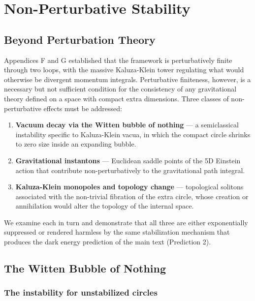 \documentclass[aps,prd,preprint,superscriptaddress,longbibliography,floatfix]{revtex4-2}
\theoremstyle{remark}
\begin{document}
\section{Non-Perturbative Stability}


\subsection{Beyond Perturbation Theory}

Appendices F and G established that the framework is perturbatively finite through two loops, with the massive Kaluza-Klein tower regulating what would otherwise be divergent momentum integrals. Perturbative finiteness, however, is a necessary but not sufficient condition for the consistency of any gravitational theory defined on a space with compact extra dimensions. Three classes of non-perturbative effects must be addressed:


\begin{enumerate}
  \item \textbf{Vacuum decay via the Witten bubble of nothing} --- a semiclassical instability specific to Kaluza-Klein vacua, in which the compact circle shrinks to zero size inside an expanding bubble.
  \item \textbf{Gravitational instantons} --- Euclidean saddle points of the 5D Einstein action that contribute non-perturbatively to the gravitational path integral.
  \item \textbf{Kaluza-Klein monopoles and topology change} --- topological solitons associated with the non-trivial fibration of the extra circle, whose creation or annihilation would alter the topology of the internal space.
\end{enumerate}

We examine each in turn and demonstrate that all three are either exponentially suppressed or rendered harmless by the same stabilization mechanism that produces the dark energy prediction of the main text (Prediction 2).



\subsection{The Witten Bubble of Nothing}


\subsubsection{The instability for unstabilized circles}
\end{document}
